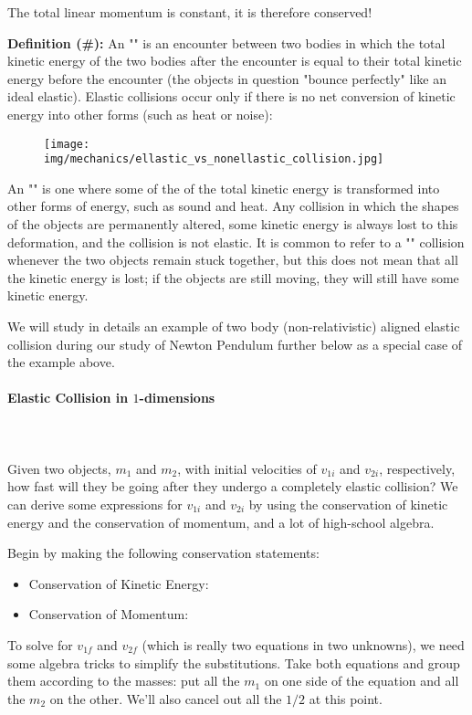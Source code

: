 	The total linear momentum is constant, it is therefore conserved!
	
	\textbf{Definition (\#\mydef):} An "" is an encounter between two bodies in which the total kinetic energy of the two bodies after the encounter is equal to their total kinetic energy before the encounter (the objects in question "bounce perfectly" like an ideal elastic). Elastic collisions occur only if there is no net conversion of kinetic energy into other forms (such as heat or noise):
	\begin{figure}[H]
		\centering
		\texttt{[image: img/mechanics/ellastic\_vs\_nonellastic\_collision.jpg]}
	\end{figure}
	An "" is one where some of the of the total kinetic energy is transformed into other forms of energy, such as sound and heat. Any collision in which the shapes of the objects are permanently altered, some kinetic energy is always lost to this deformation, and the collision is not elastic. It is common to refer to a "" collision whenever the two objects remain stuck together, but this does not mean that all the kinetic energy is lost; if the objects are still moving, they will still have some kinetic energy.
	\begin{tcolorbox}[title=Remark,colframe=black,arc=10pt]
	We will study in details an example of two body (non-relativistic) aligned elastic collision during our study of Newton Pendulum further below as a special case of the example above.
	\end{tcolorbox}
	
	\paragraph{Elastic Collision in $1$-dimensions}\mbox{}\\\\
	Given two objects, $m_1$ and $m_2$, with initial velocities of $v_{1i}$ and $v_{2i}$, respectively, how fast will they be going after they undergo a completely elastic collision? We can derive some expressions for $v_{1i}$ and $v_{2i}$ by using the conservation of kinetic energy and the conservation of momentum, and a lot of high-school algebra.
	
	Begin by making the following conservation statements:
	\begin{itemize}
		\item Conservation of Kinetic Energy:
		
	
		\item Conservation of Momentum:
		
	\end{itemize}
	To solve for $v_{1f}$ and $v_{2f}$ (which is really two equations in two unknowns), we need some algebra tricks to simplify the substitutions. Take both equations and group them according to the masses: put all the $m_1$ on one side of the equation and all the $m_2$ on the other. We'll also cancel out all the $1/2$ at this point.
	

